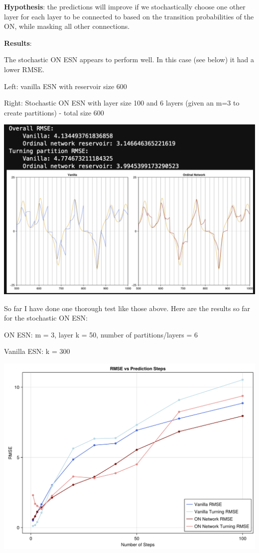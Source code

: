 \documentclass[a4paper,12pt]{article}
\begin{document}
\textbf{Hypothesis}: the predictions will improve if we stochastically choose one other layer for each layer to be connected to based on the transition probabilities of the ON, while masking all other connections.

\textbf{Results}:

The stochastic ON ESN appears to perform well. In this case (see below) it had a lower RMSE.

Left: vanilla ESN with reservoir size 600

Right: Stochastic ON ESN with layer size 100 and 6 layers (given an m=3 to create partitions) - total size 600

\includegraphics[width=\textwidth]{figure_11.png}


\newpage

So far I have done one thorough test like those above. Here are the results so far for the stochastic ON ESN:

ON ESN: m = 3, layer k = 50, number of partitions/layers = 6

Vanilla ESN: k = 300

\includegraphics[width=\textwidth]{figure_12.png}
\end{document}
